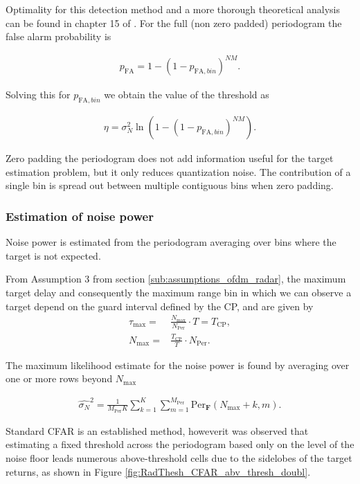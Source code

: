 	Optimality for this detection method and a more thorough theoretical analysis can be found in chapter 15 of \cite{Richards_Scheer_Holm_2010}.
	For the full (non zero padded) periodogram the false alarm probability is
	
	\begin{align}
		p_\text{FA} = 1 - (1 - p_{\text{FA},bin})^{NM}.
	\end{align}
	
	Solving this for $p_{\text{FA},bin}$ we obtain the value of the threshold as 
	
	\begin{align}
		\eta = \sigma_N^2 \ln{(1 - (1 - p_{\text{FA},bin})^{NM})}.
	\end{align}
	
	Zero padding the periodogram does not add information useful for the target estimation problem, but it only reduces quantization noise. The contribution of a single bin is spread out between multiple contiguous bins when zero padding.

	\subsubsection{Estimation of noise power}
	
		Noise power is estimated from the periodogram averaging over bins where the target is not expected.
		
		From Assumption 3 from section \ref{sub:assumptions_ofdm_radar}, the maximum target delay and consequently the maximum range bin in which we can observe a target depend on the guard interval defined by the CP, and are given by
		\begin{align}
			\tau_{\text{max}} =& \frac{N_{\text{max}}}{N_{\text{Per}}}\cdot T = T_\text{CP} ,\\
			N_{\text{max}} =& \frac{T_\text{CP}}{T}\cdot N_{\text{Per}}.
		\end{align} 
		
		The maximum likelihood estimate for the noise power is found by averaging over one or more rows beyond $N_{\text{max}}$

		\begin{align}
		\label{align: threshold_noise_power}
			\hat{\sigma_N}^2 = \frac{1}{M_{\text{Per}}K} \sum_{k=1}^K \sum_{m=1}^{M_{\text{Per}}} \text{Per}_{\bm{F}}(N_{\text{max}}+k, m).
		\end{align}

Standard CFAR is an established method, howeverit was observed that estimating a fixed threshold across the periodogram based only on the level of the noise floor leads numerous above-threshold cells due to the sidelobes of the target returns, as shown in Figure \ref{fig:RadThesh_CFAR_abv_thresh_doubl}.

